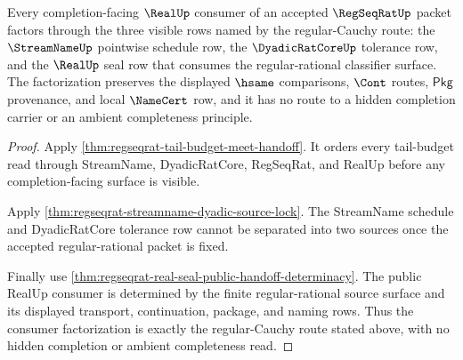 \begin{theorem}
\label{thm:regseqrat-real-seal-consumer-factorization}
Every completion-facing $\RealUp$ consumer of an accepted $\RegSeqRatUp$ packet
factors through the three visible rows named by the regular-Cauchy route:
the $\StreamNameUp$ pointwise schedule row, the $\DyadicRatCoreUp$ tolerance
row, and the $\RealUp$ seal row that consumes the regular-rational classifier
surface. The factorization preserves the displayed $\hsame$ comparisons,
$\Cont$ routes, $\mathsf{Pkg}$ provenance, and local $\NameCert$ row, and it
has no route to a hidden completion carrier or an ambient completeness
principle.
\end{theorem}
\begin{proof}
Apply \autoref{thm:regseqrat-tail-budget-meet-handoff}. It orders every
tail-budget read through StreamName, DyadicRatCore, RegSeqRat, and RealUp
before any completion-facing surface is visible.

Apply \autoref{thm:regseqrat-streamname-dyadic-source-lock}. The StreamName
schedule and DyadicRatCore tolerance row cannot be separated into two sources
once the accepted regular-rational packet is fixed.

Finally use \autoref{thm:regseqrat-real-seal-public-handoff-determinacy}. The
public RealUp consumer is determined by the finite regular-rational source
surface and its displayed transport, continuation, package, and naming rows.
Thus the consumer factorization is exactly the regular-Cauchy route stated
above, with no hidden completion or ambient completeness read.
\end{proof}


